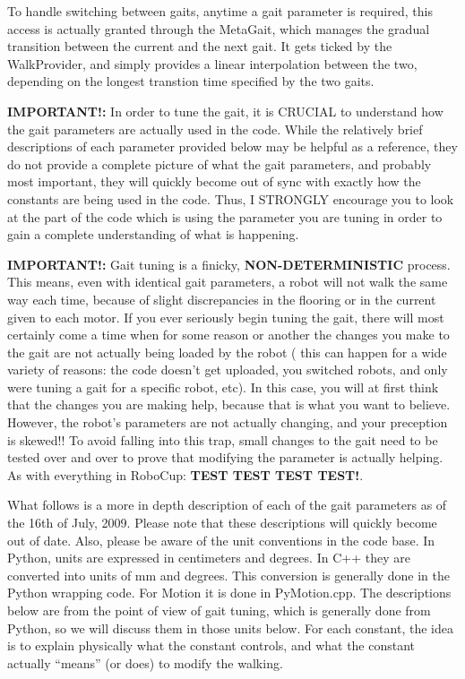 \documentclass[11pt]{article}
\begin{document}
To handle switching between gaits, anytime a gait parameter is required,
this access is actually granted through the MetaGait, which manages the
gradual transition between the current and the next gait. It gets ticked
by the WalkProvider, and simply provides a linear interpolation between
the two, depending on the longest transtion time specified by the two gaits.

{\bf IMPORTANT!:} In order to tune the gait, it is CRUCIAL to understand how
the gait parameters are actually used in the code. While the relatively brief
descriptions of each parameter provided below may be helpful as a reference,
they do not provide a complete picture of what the gait parameters, and probably
most important, they will quickly become out of sync with exactly how the
constants are being used in the code. Thus, I STRONGLY encourage you to look
at the part of the code which is using the parameter you are tuning in order
to gain a complete understanding of what is happening.

{\bf IMPORTANT!:} Gait tuning is a finicky, {\bf NON-DETERMINISTIC}
process. This means, even with identical gait parameters, a robot will not
walk the same way each time, because of slight discrepancies in the flooring
or in the current given to each motor.  If you ever seriously begin tuning
the gait, there will most certainly come a time when for some reason or another
the changes you make to the gait are not actually being loaded by the robot (
this can happen for a wide variety of reasons: the code doesn't get uploaded,
you switched robots, and only were tuning a gait for a specific robot, etc).
In this case, you will at first think that the changes you are making help,
because that is what you want to believe. However, the robot's parameters are
not actually changing, and your preception is skewed!! To avoid falling
into this trap, small changes to the gait need to be tested over and over to
prove that modifying the parameter is actually helping. As with everything in
RoboCup: {\bf TEST TEST TEST TEST!}.


What follows is a more in depth description of each of the gait parameters
as of the 16th of July, 2009. Please note that these descriptions will quickly
become out of date. Also, please be aware of the unit conventions in the code
base. In Python, units are expressed in centimeters and degrees. In C++ they
are converted into units of mm and degrees.  This conversion is generally done
in the Python wrapping code. For Motion it is done in PyMotion.cpp.
The descriptions below are from the point of view of gait tuning, which is
generally done from Python, so we will discuss them in those units below.
For each constant, the idea is to explain physically what the constant
controls, and what the constant actually ``means'' (or does) to modify the
walking.
\end{document}
